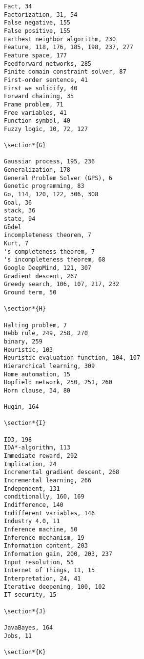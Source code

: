 \documentclass[10pt]{article}
\begin{document}
\begin{verbatim}
Fact, 34
Factorization, 31, 54
False negative, 155
False positive, 155
Farthest neighbor algorithm, 230
Feature, 118, 176, 185, 198, 237, 277
Feature space, 177
Feedforward networks, 285
Finite domain constraint solver, 87
First-order sentence, 41
First we solidify, 40
Forward chaining, 35
Frame problem, 71
Free variables, 41
Function symbol, 40
Fuzzy logic, 10, 72, 127

\section*{G}

Gaussian process, 195, 236
Generalization, 178
General Problem Solver (GPS), 6
Genetic programming, 83
Go, 114, 120, 122, 306, 308
Goal, 36
stack, 36
state, 94
Gödel
incompleteness theorem, 7
Kurt, 7
's completeness theorem, 7
's incompleteness theorem, 68
Google DeepMind, 121, 307
Gradient descent, 267
Greedy search, 106, 107, 217, 232
Ground term, 50

\section*{H}

Halting problem, 7
Hebb rule, 249, 258, 270
binary, 259
Heuristic, 103
Heuristic evaluation function, 104, 107
Hierarchical learning, 309
Home automation, 15
Hopfield network, 250, 251, 260
Horn clause, 34, 80

Hugin, 164

\section*{I}

ID3, 198
IDA*-algorithm, 113
Immediate reward, 292
Implication, 24
Incremental gradient descent, 268
Incremental learning, 266
Independent, 131
conditionally, 160, 169
Indifference, 140
Indifferent variables, 146
Industry 4.0, 11
Inference machine, 50
Inference mechanism, 19
Information content, 203
Information gain, 200, 203, 237
Input resolution, 55
Internet of Things, 11, 15
Interpretation, 24, 41
Iterative deepening, 100, 102
IT security, 15

\section*{J}

JavaBayes, 164
Jobs, 11

\section*{K}


\end{verbatim}
\end{document}
